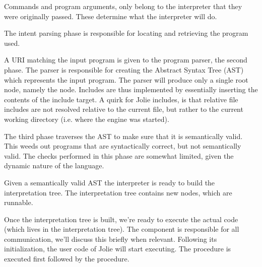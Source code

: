 Commands and program arguments, only belong to the interpreter that they were
originally passed. These determine what the interpreter will do.

The intent parsing phase is responsible for locating and retrieving the program
used.

A URI matching the input program is given to the program parser, the second
phase. The parser is responsible for creating the Abstract Syntax Tree (AST)
    which represents the input program. The parser will produce only a single
    root node, namely the  node. Includes are thus implemented by
    essentially inserting the contents of the include target. A quirk for Jolie
    includes, is that relative file includes are not resolved relative to the
    current file, but rather to the current working directory (i.e. where the
            engine was started).

The third phase traverses the AST to make sure that it is semantically valid.
This weeds out programs that are syntactically correct, but not semantically
valid. The checks performed in this phase are somewhat limited, given the
dynamic nature of the language.

Given a semantically valid AST the interpreter is ready to build the
interpretation tree. The interpretation tree contains new nodes, which are
runnable.

Once the interpretation tree is built, we're ready to execute the actual code
(which lives in the interpretation tree). The  component is
responsible for all communication, we'll discuss this briefly when relevant.
Following its initialization, the user code of Jolie will start executing. The
 procedure is executed first followed by the 
procedure.
